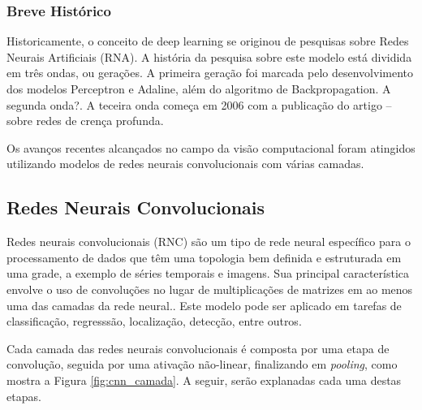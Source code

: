 \subsubsection{Breve Histórico}
Historicamente, o conceito de deep learning se originou de pesquisas sobre Redes Neurais Artificiais (RNA). A história da pesquisa sobre este modelo está dividida em três ondas, ou gerações. A primeira geração foi marcada pelo desenvolvimento dos modelos Perceptron e Adaline, além do algoritmo de Backpropagation. A segunda onda?. A teceira onda começa em 2006 com a publicação do artigo -- sobre redes de crença profunda.

Os avanços recentes alcançados no campo da visão computacional foram atingidos utilizando modelos de redes neurais convolucionais com várias camadas.


\subsection{Redes Neurais Convolucionais}
Redes neurais convolucionais (RNC) são um tipo de rede neural específico para o processamento de dados que têm uma topologia bem definida e estruturada em uma grade, a exemplo de séries temporais e imagens. Sua principal característica envolve o uso de convoluções no lugar de multiplicações de matrizes em ao menos uma das camadas da rede neural.\cite{goodfellow2016deep}. Este modelo pode ser aplicado em tarefas de classificação, regresssão, localização, detecção, entre outros.

Cada camada das redes neurais convolucionais é composta por uma etapa de convolução, seguida por uma ativação não-linear, finalizando em \emph{pooling}, como mostra a Figura \ref{fig:cnn_camada}. A seguir, serão explanadas cada uma destas etapas.


